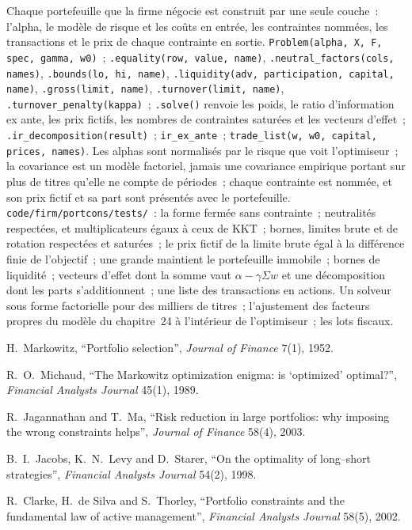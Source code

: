 \begin{build}
 Chaque portefeuille que la firme négocie est construit par une seule couche~: l'alpha, le modèle de risque et les coûts en entrée, les contraintes nommées, les transactions et le prix de
chaque contrainte en sortie.
 \texttt{Problem(alpha, X, F, spec, gamma, w0)}~; \texttt{.equality(row, value, name)}, \texttt{.neutral\_factors(cols, names)},
\texttt{.bounds(lo, hi, name)}, \texttt{.liquidity(adv, participation, capital, name)}, \texttt{.gross(limit, name)}, \texttt{.turnover(limit, name)},
\texttt{.turnover\_penalty(kappa)}~; \texttt{.solve()} renvoie les poids, le ratio d'information ex ante, les prix fictifs, les nombres de contraintes saturées et les vecteurs d'effet~;
\texttt{.ir\_decomposition(result)}~; \texttt{ir\_ex\_ante}~; \texttt{trade\_list(w, w0, capital, prices, names)}.
 Les alphas sont normalisés par le risque que voit l'optimiseur~; la covariance est un modèle factoriel, jamais une covariance empirique portant sur plus de titres qu'elle ne compte de périodes~;
chaque contrainte est nommée, et son prix fictif et sa part sont présentés avec le portefeuille.
 \texttt{code/firm/portcons/tests/}~: la forme fermée sans contrainte~; neutralités respectées, et multiplicateurs égaux à ceux de KKT~; bornes,
limites brute et de rotation respectées et saturées~; le prix fictif de la limite brute égal à la différence finie de l'objectif~; une grande  maintient le portefeuille immobile~;
bornes de liquidité~; vecteurs d'effet dont la somme vaut $\alpha - \gamma\Sigma w$ et une décomposition dont les parts s'additionnent~; une liste des transactions en actions.
 Un solveur sous forme factorielle pour des milliers de titres~; l'ajustement des facteurs propres du modèle du chapitre~24 à l'intérieur de l'optimiseur~; les lots fiscaux.
\end{build}

\begin{omsources}
\item H.~Markowitz, ``Portfolio selection'', \emph{Journal of Finance} 7(1), 1952.
\item R.~O.~Michaud, ``The Markowitz optimization enigma: is `optimized' optimal?'', \emph{Financial Analysts Journal} 45(1), 1989.
\item R.~Jagannathan and T.~Ma, ``Risk reduction in large portfolios: why imposing the wrong constraints helps'', \emph{Journal of Finance} 58(4), 2003.
\item B.~I.~Jacobs, K.~N.~Levy and D.~Starer, ``On the optimality of long--short strategies'', \emph{Financial Analysts Journal} 54(2), 1998.
\item R.~Clarke, H.~de Silva and S.~Thorley, ``Portfolio constraints and the fundamental law of active management'', \emph{Financial Analysts Journal} 58(5), 2002.
\end{omsources}

